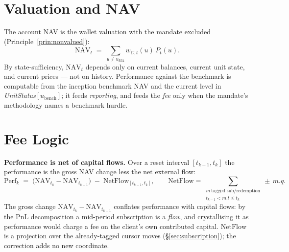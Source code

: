\documentclass[11pt,a4paper]{article}
\begin{document}
\section{Valuation and NAV}
\label{sec:nav}

The account NAV is the wallet valuation with the mandate excluded
(Principle~\ref{prin:nonvalued}):
\[
\mathrm{NAV}_t \;=\; \sum_{u\neq u_{\mathrm{MA}}} w_{C,t}(u)\,P_t(u).
\]
By state-sufficiency, $\mathrm{NAV}_t$ depends only on current balances, current unit state, and
current prices --- not on history. Performance against the benchmark is computable from the
inception benchmark NAV and the current level in \textit{UnitStatus}$[u_{\mathrm{bench}}]$; it
feeds \emph{reporting}, and feeds the \emph{fee} only when the mandate's methodology names a
benchmark hurdle.

\section{Fee Logic}
\label{sec:fees}

\noindent\textbf{Performance is net of capital flows.} Over a reset interval
$[t_{k-1},t_k]$ the performance is the gross NAV change less the net external flow:
\[
\mathrm{Perf}_k \;=\; \big(\mathrm{NAV}_{t_k}-\mathrm{NAV}_{t_{k-1}}\big)\;-\;
\mathrm{NetFlow}_{[t_{k-1},t_k]},\qquad
\mathrm{NetFlow}=\!\!\sum_{\substack{m\ \text{tagged sub/redemption}\\ t_{k-1}<m.t\le t_k}}\!\!\pm\,m.q.
\]
The gross change $\mathrm{NAV}_{t_k}-\mathrm{NAV}_{t_{k-1}}$ conflates performance with capital
flows: by the PnL decomposition a mid-period subscription is a \emph{flow}, and crystallising it
as performance would charge a fee on the client's own contributed capital. $\mathrm{NetFlow}$ is a
projection over the already-tagged cursor moves (\S\ref{sec:subscription}); the correction adds no
new coordinate.
\end{document}
